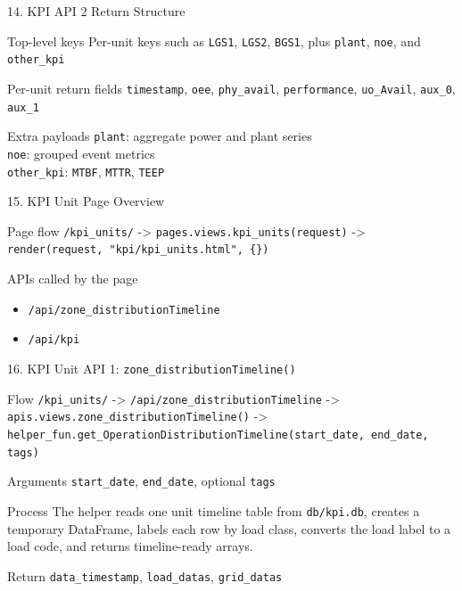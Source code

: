\documentclass[aspectratio=169]{beamer}
\begin{document}
\begin{frame}{14. KPI API 2 Return Structure}
\justifying
\begin{block}{Top-level keys}
Per-unit keys such as \texttt{LGS1}, \texttt{LGS2}, \texttt{BGS1}, plus
\texttt{plant}, \texttt{noe}, and \texttt{other\_kpi}
\end{block}

\begin{block}{Per-unit return fields}
\texttt{timestamp}, \texttt{oee}, \texttt{phy\_avail}, \texttt{performance}, \texttt{uo\_Avail}, \texttt{aux\_0}, \texttt{aux\_1}
\end{block}

\begin{block}{Extra payloads}
\texttt{plant}: aggregate power and plant series\\
\texttt{noe}: grouped event metrics\\
\texttt{other\_kpi}: \texttt{MTBF}, \texttt{MTTR}, \texttt{TEEP}
\end{block}
\end{frame}

\begin{frame}{15. KPI Unit Page Overview}
\justifying
\begin{block}{Page flow}
\texttt{/kpi\_units/} -> \texttt{pages.views.kpi\_units(request)} ->
\texttt{render(request, "kpi/kpi\_units.html", \{\})}
\end{block}

\begin{block}{APIs called by the page}
\begin{itemize}
    \item \texttt{/api/zone\_distributionTimeline}
    \item \texttt{/api/kpi}
\end{itemize}
\end{block}
\end{frame}

\begin{frame}{16. KPI Unit API 1: \texttt{zone\_distributionTimeline()}}
\justifying
\begin{block}{Flow}
\texttt{/kpi\_units/} -> \texttt{/api/zone\_distributionTimeline} ->
\texttt{apis.views.zone\_distributionTimeline()} ->
\texttt{helper\_fun.get\_OperationDistributionTimeline(start\_date, end\_date, tags)}
\end{block}

\begin{block}{Arguments}
\texttt{start\_date}, \texttt{end\_date}, optional \texttt{tags}
\end{block}

\begin{block}{Process}
The helper reads one unit timeline table from \texttt{db/kpi.db},
creates a temporary DataFrame, labels each row by load class,
converts the load label to a load code,
and returns timeline-ready arrays.
\end{block}

\begin{block}{Return}
\texttt{data\_timestamp}, \texttt{load\_datas}, \texttt{grid\_datas}
\end{block}
\end{frame}
\end{document}
